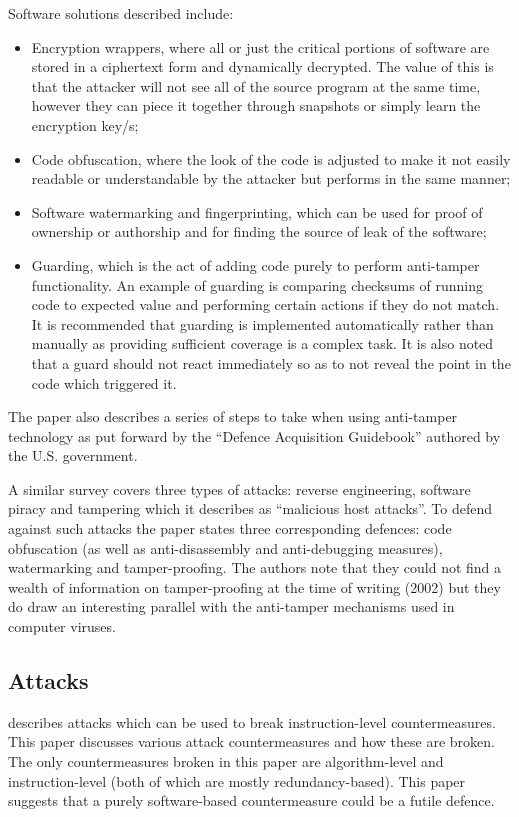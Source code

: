 Software solutions described include:
\begin{itemize}
	\item Encryption wrappers, where all or just the critical portions of software are stored in a ciphertext form and dynamically decrypted.  The value of this is that the attacker will not see all of the source program at the same time, however they can piece it together through snapshots or simply learn the encryption key/s;
	\item Code obfuscation, where the look of the code is adjusted to make it not easily readable or understandable by the attacker but performs in the same manner;
	\item Software watermarking and fingerprinting, which can be used for proof of ownership or authorship and for finding the source of leak of the software;
	\item Guarding, which is the act of adding code purely to perform anti-tamper functionality. An example of guarding is comparing checksums of running code to expected value and performing certain actions if they do not match. It is recommended that guarding is implemented automatically rather than manually as providing sufficient coverage is a complex task. It is also noted that a guard should not react immediately so as to not reveal the point in the code which triggered it.
\end{itemize}
The paper also describes a series of steps to take when using anti-tamper technology as put forward by the ``Defence Acquisition Guidebook'' authored by the U.S. government.

A similar survey \cite{Collberg2002} covers three types of attacks: reverse engineering, software piracy and tampering which it describes as ``malicious host attacks''. To defend against such attacks the paper states three corresponding defences: code obfuscation (as well as anti-disassembly and anti-debugging measures), watermarking and tamper-proofing. The authors note that they could not find a wealth of information on tamper-proofing at the time of writing (2002) but they do draw an interesting parallel with the anti-tamper mechanisms used in computer viruses.  

\subsection{Attacks}

\cite{Yuce2016a} describes attacks which can be used to break instruction-level countermeasures. This paper discusses various attack countermeasures and how these are broken. The only countermeasures broken in this paper are algorithm-level and instruction-level (both of which are mostly redundancy-based). This paper suggests that a purely software-based countermeasure could be a futile defence.

